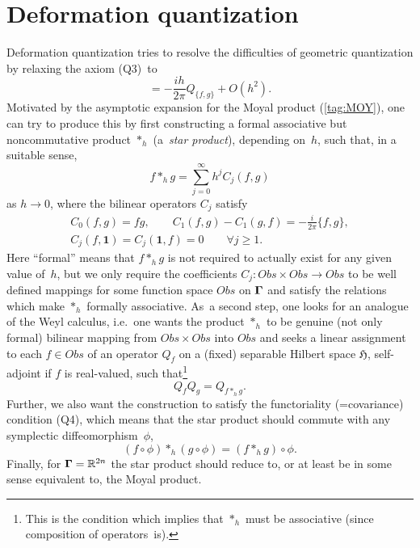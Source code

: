 \documentclass[11pt]{amsart}
\numberwithin{equation}{section}
\theoremstyle{remark}
\let\boldkey\mathbf \let\bold\mathbf
\newcommand\jedna{{\boldkey1}}
\newcommand\Obs{Obs}
\newcommand\Omg{{\bigam}}   %
\newcommand\HH{\mathfrak H}
\newcommand\RR{\mathbb R}
\newcommand{\bigam}{\mbox{\boldmath $\Gamma$}}
\begin{document}
\section{Deformation quantization} \label{sec3}
Deformation quantization tries to resolve the difficulties of geometric
quantization by relaxing the axiom (Q3)~to
\begin{equation}  [Q_f,Q_g] = -\frac{ih}{2\pi} Q_{\{f,g\}} + O(h^2).
\label{tag:Da}  \end{equation}
Motivated by the asymptotic expansion for the Moyal product (\ref{tag:MOY}),
one can try to produce this by first constructing a formal associative but
noncommutative product $*_h$ (a~{\sl star product\/}), depending on~$h$, such
that, in a suitable sense,
\begin{equation}  f *_h g = \sum_{j=0}^\infty  h^j C_j(f,g)  \label{tag:Db}
\end{equation}
as $h\to0$, where the bilinear operators $C_j$ satisfy
\begin{gather}
C_0(f,g)=fg, \qquad C_1(f,g)-C_1(g,f)=-\tfrac i{2\pi}\{f,g\},  \label{tag:Dc}
\\ C_j(f,\jedna)=C_j(\jedna,f)=0 \qquad \forall j\ge1.  \label{tag:Dca}
\end{gather}
Here ``formal'' means that $f*_h g$ is not required to actually exist for any
given value of~$h$, but we only require the coefficients $C_j:\Obs\times\Obs\to
\Obs$ to be well defined mappings for some function space $\Obs$ on $\Omg$ and
satisfy the relations which make $*_h$ formally associative. As~a second step,
one looks for an analogue of the Weyl calculus, i.e.~one wants the product
$*_h$ to be genuine (not only formal) bilinear mapping from $\Obs\times\Obs$
into $\Obs$ and seeks a linear assignment to each $f\in\Obs$ of an operator
$Q_f$ on a (fixed) separable Hilbert space $\HH$, self-adjoint if $f$ is
real-valued, such that\footnote{This is the condition which implies that $*_h$
must be associative (since composition of operators~is).}
\begin{equation}  Q_f Q_g = Q_{f*_h g}.  \label{tag:Dd}  \end{equation}
Further, we also want the construction to satisfy the functoriality
(=covariance) condition (Q4), which means that the star product should commute
with any symplectic diffeomorphism~$\phi$,
\begin{equation}  (f\circ\phi) *_h (g\circ\phi) = (f*_h g)\circ\phi.
\label{tag:Dda}  \end{equation}
Finally, for $\Omg=\RR^{2n}$ the star product should reduce to, or at least be
in some sense equivalent to, the Moyal product.
\end{document}
